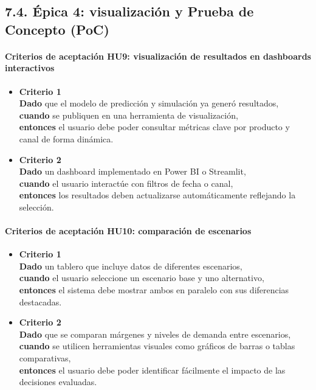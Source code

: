 \documentclass[
11pt, %
]{charter}
\begin{document}
\newpage

\subsection*{7.4. Épica 4: visualización y Prueba de Concepto (PoC)}

\paragraph{Criterios de aceptación HU9: visualización de resultados en dashboards interactivos}
\begin{itemize}
  \item \textbf{Criterio 1} \\
  \textbf{Dado} que el modelo de predicción y simulación ya generó resultados, \\
  \textbf{cuando} se publiquen en una herramienta de visualización, \\
  \textbf{entonces} el usuario debe poder consultar métricas clave por producto y canal de forma dinámica.
  
  \item \textbf{Criterio 2} \\
  \textbf{Dado} un dashboard implementado en Power BI o Streamlit, \\
  \textbf{cuando} el usuario interactúe con filtros de fecha o canal, \\
  \textbf{entonces} los resultados deben actualizarse automáticamente reflejando la selección.
\end{itemize}

\vspace{1em}

\paragraph{Criterios de aceptación HU10: comparación de escenarios}
\begin{itemize}
  \item \textbf{Criterio 1} \\
  \textbf{Dado} un tablero que incluye datos de diferentes escenarios, \\
  \textbf{cuando} el usuario seleccione un escenario base y uno alternativo, \\
  \textbf{entonces} el sistema debe mostrar ambos en paralelo con sus diferencias destacadas.

  \item \textbf{Criterio 2} \\
  \textbf{Dado} que se comparan márgenes y niveles de demanda entre escenarios, \\
  \textbf{cuando} se utilicen herramientas visuales como gráficos de barras o tablas comparativas, \\
  \textbf{entonces} el usuario debe poder identificar fácilmente el impacto de las decisiones evaluadas.
\end{itemize}
\end{document}
